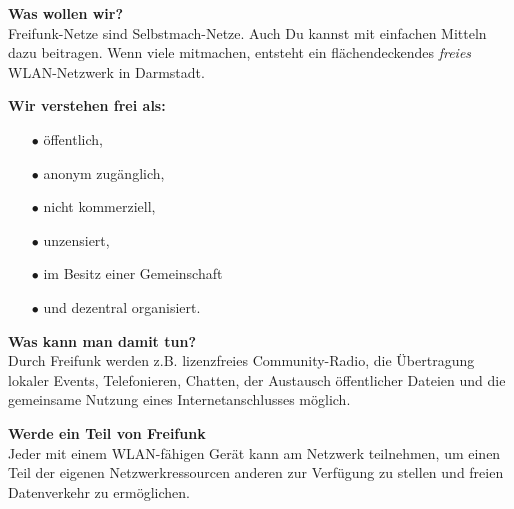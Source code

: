 \documentclass[a4paper]{article}
\begin{document}
\begin{Row}
    \begin{Cell}{1}
    \textbf{Was wollen wir?} \\
    Freifunk-Netze sind Selbstmach-Netze. Auch Du kannst mit einfachen Mitteln dazu beitragen. Wenn viele mitmachen, entsteht ein flächendeckendes \textit{freies} WLAN-Netzwerk in Darmstadt.
    \end{Cell}
    \begin{Cell}{1}    
    \textbf{Wir verstehen frei als:} \vspace*{-0.18cm}
	\begin{itemize}
	   \item[\textcolor{freifunkpink}{\Large$\bullet$}] öffentlich, \vspace*{-0.3cm}
	   \item[\textcolor{freifunkpink}{\Large$\bullet$}] anonym zugänglich, \vspace*{-0.3cm}
	   \item[\textcolor{freifunkpink}{\Large$\bullet$}] nicht kommerziell, \vspace*{-0.3cm}
	   \item[\textcolor{freifunkpink}{\Large$\bullet$}] unzensiert, \vspace*{-0.3cm}
	   \item[\textcolor{freifunkpink}{\Large$\bullet$}] im Besitz einer Gemeinschaft\vspace*{-0.3cm}
	   \item[\textcolor{freifunkpink}{\Large$\bullet$}] und dezentral organisiert.
	\end{itemize}
    \end{Cell}
\end{Row}
\newpage

\thispagestyle{empty}

\begin{Row}[cellsep=0.75cm]
    \begin{Cell}{1}
    \textbf{Was kann man damit tun?} \\
    Durch Freifunk werden z.B. lizenzfreies Community-Radio, die Übertragung lokaler Events, Telefonieren, Chatten, der Austausch öffentlicher Dateien und die gemeinsame Nutzung eines Internetanschlusses möglich.
    \end{Cell} 
\begin{Cell}{1}
    \textbf{Werde ein Teil von Freifunk} \\
    Jeder mit einem WLAN-fähigen Gerät kann am Netzwerk teilnehmen, um einen Teil der eigenen Netzwerkressourcen anderen zur Verfügung zu stellen und freien Datenverkehr zu ermöglichen.
\end{Cell}
\end{Row}
\end{document}
